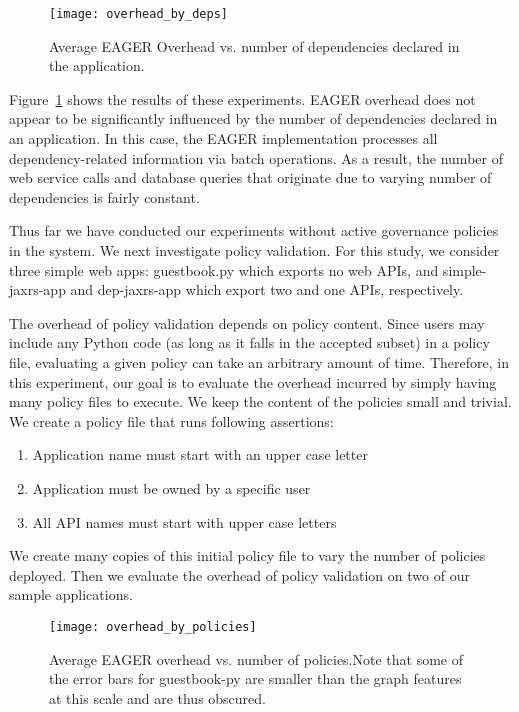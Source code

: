 \begin{figure}
\centering
\texttt{[image: overhead\_by\_deps]}
\caption{Average EAGER Overhead vs. number of dependencies declared in the
application.}
\label{fig:overhead_by_deps}
\vspace{-0.2in}
\end{figure}

Figure~\ref{fig:overhead_by_deps} shows the results of these experiments. 
EAGER overhead does not appear to be significantly
influenced by the number of dependencies declared in an application. 
In this case, the EAGER implementation processes
all dependency-related information via batch operations. 
As a result, the number of web service calls and database queries that originate 
due to varying number of dependencies is fairly constant. 

Thus far we have conducted our experiments without active governance 
policies in the system. We next investigate policy validation. For this study,
we consider three simple web apps: guestbook.py which exports no web APIs, 
and simple-jaxrs-app and dep-jaxrs-app which export two and one APIs, respectively.

The overhead of policy validation depends on policy
content. Since users may include any Python code 
(as long as it falls in the accepted subset) in a policy file, evaluating a
given policy can take an arbitrary amount of time.  Therefore, in this
experiment, our goal is to evaluate the overhead incurred by simply having
many policy files to execute. We keep the content of the policies small and
trivial. We create a policy file that runs following assertions:
\begin{enumerate} 
\item Application name must start with an upper case letter
\item Application must be owned by a specific user 
\item All API names must start with upper case letters 
\end{enumerate} We create many copies of this
initial policy file to vary the number of policies deployed. Then we evaluate
the overhead of policy validation on two of our sample applications.

\begin{figure}
\centering
\texttt{[image: overhead\_by\_policies]}
\caption{Average EAGER overhead vs. number of policies.Note that some of the error bars for 
guestbook-py are smaller than the graph features at this scale and are thus obscured.}
\label{fig:overhead_by_policies}
\end{figure}

